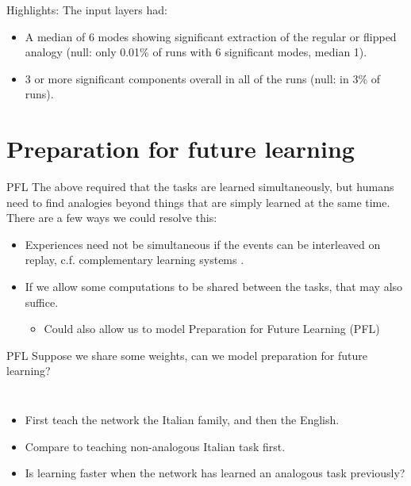 \documentclass{beamer}
\begin{document}
\begin{frame}{Highlights:}
The input layers had:
\begin{itemize}
    \item<1-> A median of 6 modes showing significant extraction of the regular or flipped analogy (null: only 0.01\% of runs with 6 significant modes, median 1).
    \item<2-> 3 or more significant components overall in all of the runs (null: in 3\% of runs).
\end{itemize}
\end{frame}

\section{Preparation for future learning}
\begin{frame}{PFL}
The above required that the tasks are learned simultaneously, but humans need to find analogies beyond things that are simply learned at the same time. There are a few ways we could resolve this: 
\begin{itemize}
\item<2-> Experiences need not be simultaneous if the events can be interleaved on replay, c.f. complementary learning systems \cite{Kumaran2016}.
\item<3-> If we allow some computations to be shared between the tasks, that may also suffice.
\begin{itemize}
\item<4-> Could also allow us to model Preparation for Future Learning (PFL)
\end{itemize}
\end{itemize}
\end{frame}



\begin{frame}{PFL}
Suppose we share some weights, can we model preparation for future learning?\\[11pt]
\begin{columns}
    \begin{itemize}
    \item<2-> First teach the network the Italian family, and then the English.
    \item<3-> Compare to teaching non-analogous Italian task first.
    \item<4-> Is learning faster when the network has learned an analogous task previously?
    \end{itemize}
\end{columns}
\end{frame}
\end{document}
